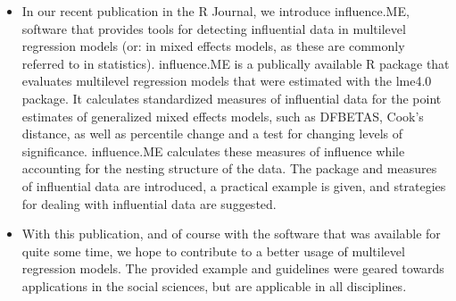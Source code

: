 \begin{itemize}
\item In our recent publication in the R Journal, we introduce influence.ME, software that provides tools for detecting influential data in multilevel regression models (or: in mixed effects models, as these are commonly referred to in statistics). influence.ME is a publically available R package that evaluates multilevel regression models that were estimated with the lme4.0 package. It calculates standardized measures of influential data for the point estimates of generalized mixed effects models, such as DFBETAS, Cook’s distance, as well as percentile change and a test for changing levels of significance. influence.ME calculates these measures of influence while accounting for the nesting structure of the data. The package and measures of influential data are introduced, a practical example is given, and strategies for dealing with influential data are suggested.

\item With this publication, and of course with the software that was available for quite some time, we hope to contribute to a better usage of multilevel regression models. The provided example and guidelines were geared towards applications in the social sciences, but are applicable in all disciplines.
\end{itemize}



